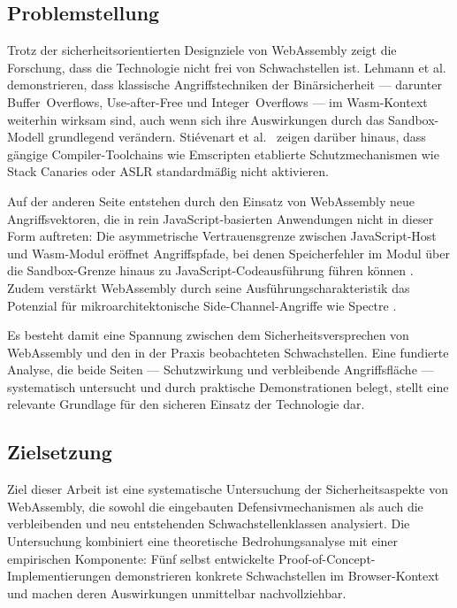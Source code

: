\subsection{Problemstellung}

Trotz der sicherheitsorientierten Designziele von WebAssembly zeigt die Forschung, dass die Technologie nicht frei von Schwachstellen ist. Lehmann et al.~\cite{255318} demonstrieren, dass klassische Angriffstechniken der Binärsicherheit --- darunter Buffer~Overflows, Use-after-Free und Integer~Overflows --- im Wasm-Kontext weiterhin wirksam sind, auch wenn sich ihre Auswirkungen durch das Sandbox-Modell grundlegend verändern. Stiévenart et al.~\cite{stiévenart2021securityrisklackingcompiler} zeigen darüber hinaus, dass gängige Compiler-Toolchains wie Emscripten etablierte Schutzmechanismen wie Stack Canaries oder ASLR standardmäßig nicht aktivieren.

Auf der anderen Seite entstehen durch den Einsatz von WebAssembly neue Angriffsvektoren, die in rein JavaScript-basierten Anwendungen nicht in dieser Form auftreten: Die asymmetrische Vertrauensgrenze zwischen JavaScript-Host und Wasm-Modul eröffnet Angriffspfade, bei denen Speicherfehler im Modul über die Sandbox-Grenze hinaus zu JavaScript-Codeausführung führen können \cite{10.1145/3728937}. Zudem verstärkt WebAssembly durch seine Ausführungscharakteristik das Potenzial für mikroarchitektonische Side-Channel-Angriffe wie Spectre \cite{PERRONE2025100728}.

Es besteht damit eine Spannung zwischen dem Sicherheitsversprechen von WebAssembly und den in der Praxis beobachteten Schwachstellen. Eine fundierte Analyse, die beide Seiten --- Schutzwirkung und verbleibende Angriffsfläche --- systematisch untersucht und durch praktische Demonstrationen belegt, stellt eine relevante Grundlage für den sicheren Einsatz der Technologie dar.

\subsection{Zielsetzung}

Ziel dieser Arbeit ist eine systematische Untersuchung der Sicherheitsaspekte von WebAssembly, die sowohl die eingebauten Defensivmechanismen als auch die verbleibenden und neu entstehenden Schwachstellenklassen analysiert. Die Untersuchung kombiniert eine theoretische Bedrohungsanalyse mit einer empirischen Komponente: Fünf selbst entwickelte Proof-of-Concept-Implementierungen demonstrieren konkrete Schwachstellen im Browser-Kontext und machen deren Auswirkungen unmittelbar nachvollziehbar.

